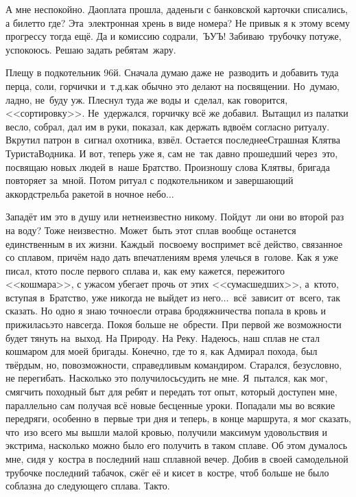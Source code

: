 А мне неспокойно. Да\mdash оплата прошла, да\mdash деньги с банковской карточки списались, а билет\sdash то где? Эта~электронная хрень в виде номера? Не привык я к этому всему прогрессу тогда ещё. Да и комиссию содрали,~ЪУЪ! Забиваю~трубочку потуже, успокоюсь. Решаю задать ребятам~жару.

Плещу в подкотельник 96\sdash й. Сначала думаю даже не~разводить и добавить туда перца, соли, горчички и~т.д.\mdash как обычно это делают на посвящении. Но~думаю, ладно, не~буду уж. Плеснул туда же воды и~сделал, как говорится, <<сортировку>>. Не~удержался, горчичку всё же добавил. Вытащил из палатки весло, собрал, дал им в руки, показал, как держать вдвоём согласно ритуалу. Вкрутил патрон в~сигнал охотника, взвёл. Остается последнее\mdash Страшная Клятва Туриста\sdash Водника. И вот, теперь уже я, сам не~так давно прошедший через~это, посвящаю новых людей в~наше Братство. Произношу слова Клятвы, бригада повторяет за~мной. Потом ритуал с подкотельником и завершающий аккорд\mdash стрельба ракетой в ночное небо$\ldots$   

Западёт им это в душу или нет\mdash неизвестно никому. Пойдут~ли они во второй раз на воду? Тоже неизвестно. Может~быть этот сплав вообще останется единственным в их жизни. Каждый~по\sdash своему воспримет всё действо, связанное со сплавом, причём надо дать впечатлениям время улечься в~голове. Как я уже писал, кто\sdash то после первого сплава и, как ему кажется, пережитого <<кошмара>>, с ужасом убегает прочь от этих <<сумасшедших>>, а~кто\sdash то, вступая в~Братство, уже никогда не выйдет из него$\ldots$~всё~зависит от~всего, так сказать. Но одно я знаю точно\mdash если отрава бродяжничества попала в кровь и прижилась\mdash это навсегда. Покоя больше не~обрести. При первой же возможности будет тянуть на~выход. На Природу. На Реку.
\newpage
Надеюсь, наш сплав не стал кошмаром для моей бригады. Конечно, где то я, как Адмирал похода, был твёрдым, но, по\sdash возможности, справедливым командиром. Старался, безусловно, не перегибать. Насколько это получилось\mdash судить не мне. Я~пытался, как мог, смягчить походный быт для ребят и передать тот опыт, который доступен мне, параллельно сам получая всё новые бесценные уроки. Попадали мы во всякие передряги, особенно в~первые три дня и теперь, в конце маршрута, я мог сказать, что~изо всего мы вышли малой кровью, получили максимум удовольствия и экстрима, насколько можно было его получить в таком сплаве. Об этом думалось мне, сидя у~костра в последний наш сплавной вечер. Добив в своей самодельной трубочке последний табачок, сжёг её и кисет в~костре, чтоб больше не было соблазна до следующего сплава. Так\sdash то. 

\begin{center}
\end{center}
